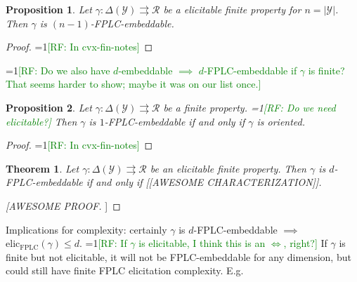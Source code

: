 \documentclass[11pt]{article}
\newcommand{\Comments}{1}
\newcommand{\mynote}[2]{\ifnum\Comments=1\textcolor{#1}{#2}\fi}
\newcommand{\raf}[1]{\mynote{green}{[RF: #1]}}
\newcommand{\R}{\mathcal{R}}
\newcommand{\Y}{\mathcal{Y}}
\newcommand{\toto}{\rightrightarrows}
\newcommand{\FPLC}{\mathrm{FPLC}}
\newcommand{\elic}{\mathrm{elic}}
\newtheorem{theorem}{Theorem}
\newtheorem{proposition}{Proposition}
\begin{document}
\begin{proposition}
  Let $\gamma:\Delta(\Y)\toto\R$ be a elicitable finite property for $n=|\Y|$.
  Then $\gamma$ is $(n-1)$-FPLC-embeddable.
\end{proposition}
\begin{proof}
  \raf{In cvx-fin-notes}  
\end{proof}

\raf{Do we also have $d$-embeddable $\implies$ $d$-FPLC-embeddable if $\gamma$ is finite?  That seems harder to show; maybe it was on our list once.}

\begin{proposition}
  Let $\gamma:\Delta(\Y)\toto\R$ be a finite property. \raf{Do we need elicitable?}
  Then $\gamma$ is $1$-FPLC-embeddable if and only if $\gamma$ is oriented.
\end{proposition}
\begin{proof}
  \raf{In cvx-fin-notes}
\end{proof}

\begin{theorem}
  Let $\gamma:\Delta(\Y)\toto\R$ be an elicitable finite property.
  Then $\gamma$ is $d$-FPLC-embeddable if and only if [[AWESOME CHARACTERIZATION]].
\end{theorem}
\begin{proof}
  [[AWESOME PROOF]]
\end{proof}

Implications for complexity: certainly $\gamma$ is $d$-FPLC-embeddable $\implies$ $\elic_\FPLC(\gamma) \leq d$.
\raf{If $\gamma$ is elicitable, I think this is an $\iff$, right?}
If $\gamma$ is finite but not elicitable, it will not be FPLC-embeddable for any dimension, but could still have finite FPLC elicitation complexity.
E.g.\ 
\end{document}
